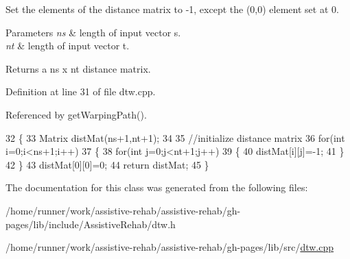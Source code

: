 Set the elements of the distance matrix to -\/1, except the (0,0) element set at 0. 


\begin{DoxyParams}{Parameters}
{\em ns} & length of input vector s. \\
\hline
{\em nt} & length of input vector t. \\
\hline
\end{DoxyParams}
\begin{DoxyReturn}{Returns}
a ns x nt distance matrix. 
\end{DoxyReturn}


Definition at line 31 of file dtw.\+cpp.



Referenced by get\+Warping\+Path().


\begin{DoxyCode}
32 \{
33     Matrix distMat(ns+1,nt+1);
34 
35     \textcolor{comment}{//initialize distance matrix}
36     \textcolor{keywordflow}{for}(\textcolor{keywordtype}{int} i=0;i<ns+1;i++)
37     \{
38         \textcolor{keywordflow}{for}(\textcolor{keywordtype}{int} j=0;j<nt+1;j++)
39         \{
40             distMat[i][j]=-1;
41         \}
42     \}
43     distMat[0][0]=0;
44     \textcolor{keywordflow}{return} distMat;
45 \}
\end{DoxyCode}


The documentation for this class was generated from the following files\+:\begin{DoxyCompactItemize}
\item 
/home/runner/work/assistive-\/rehab/assistive-\/rehab/gh-\/pages/lib/include/\+Assistive\+Rehab/dtw.\+h\item 
/home/runner/work/assistive-\/rehab/assistive-\/rehab/gh-\/pages/lib/src/\hyperlink{dtw_8cpp}{dtw.\+cpp}\end{DoxyCompactItemize}
